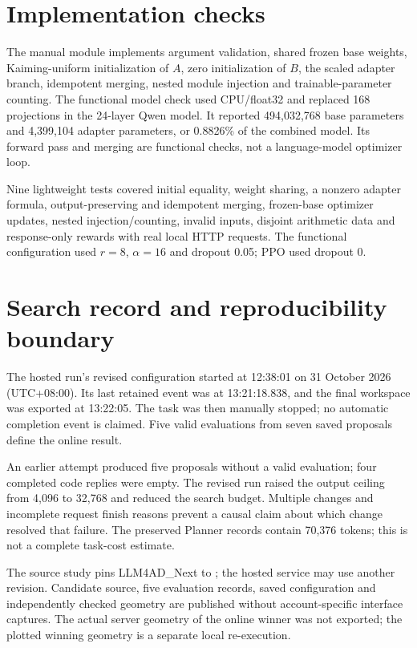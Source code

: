 \section{Implementation checks}\label{app:implementation}
The manual module  implements argument validation, shared frozen base weights, Kaiming-uniform initialization of $A$, zero initialization of $B$, the scaled adapter branch, idempotent merging, nested module injection and trainable-parameter counting. The functional model check used CPU/float32 and replaced 168 projections in the 24-layer Qwen model. It reported 494,032,768 base parameters and 4,399,104 adapter parameters, or 0.8826\% of the combined model. Its forward pass and merging are functional checks, not a language-model optimizer loop.

Nine lightweight tests covered initial equality, weight sharing, a nonzero adapter formula, output-preserving and idempotent merging, frozen-base optimizer updates, nested injection/counting, invalid inputs, disjoint arithmetic data and response-only rewards with real local HTTP requests. The functional configuration used $r=8$, $\alpha=16$ and dropout 0.05; PPO used dropout 0.

\section{Search record and reproducibility boundary}\label{app:platform}
The hosted run's revised configuration started at 12:38:01 on 31 October 2026 (UTC+08:00). Its last retained event was at 13:21:18.838, and the final workspace was exported at 13:22:05. The task was then manually stopped; no automatic completion event is claimed. Five valid evaluations from seven saved proposals define the online result.

An earlier attempt produced five proposals without a valid evaluation; four completed code replies were empty. The revised run raised the output ceiling from 4,096 to 32,768 and reduced the search budget. Multiple changes and incomplete request finish reasons prevent a causal claim about which change resolved that failure. The preserved Planner records contain 70,376 tokens; this is not a complete task-cost estimate.

The source study pins LLM4AD\_Next to ; the hosted service may use another revision. Candidate source, five evaluation records, saved configuration and independently checked geometry are published without account-specific interface captures. The actual server geometry of the online winner was not exported; the plotted winning geometry is a separate local re-execution.

